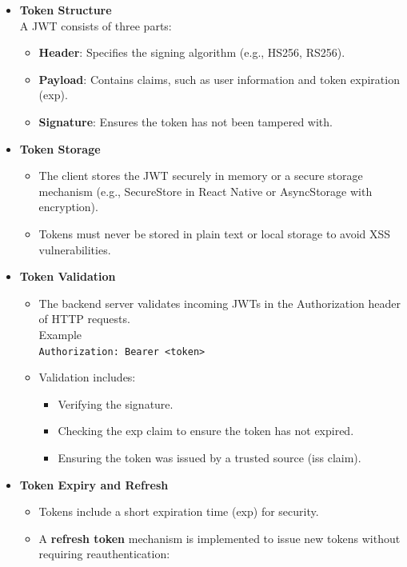 \documentclass[12pt, titlepage]{article}
\begin{document}
\begin{enumerate}
\begin{itemize}
\begin{itemize}
\begin{itemize}
			\end{itemize}
			\item \textbf{Token Structure}
			\\ A JWT consists of three parts:
			\begin{itemize}
				\item \textbf{Header}: Specifies the signing algorithm (e.g., HS256, RS256).
				\item \textbf{Payload}: Contains claims, such as user information and token expiration (exp).
				\item \textbf{Signature}: Ensures the token has not been tampered with.
			\end{itemize}
			\item \textbf{Token Storage}
			\begin{itemize}
				\item The client stores the JWT securely in memory or a secure storage mechanism (e.g., SecureStore in React Native or AsyncStorage with encryption).
				\item Tokens must never be stored in plain text or local storage to avoid XSS vulnerabilities.
			\end{itemize}
			\item \textbf{Token Validation}
			\begin{itemize}
				\item The backend server validates incoming JWTs in the Authorization header of HTTP requests.
				\\ Example \\
				\texttt{Authorization: Bearer <token>}
				\item Validation includes:
				\begin{itemize}
					\item Verifying the signature.
					\item Checking the exp claim to ensure the token has not expired.
					\item Ensuring the token was issued by a trusted source (iss claim).
				\end{itemize}
			\end{itemize}
			\item \textbf{Token Expiry and Refresh}
			\begin{itemize}
				\item Tokens include a short expiration time (exp) for security.
				\item A \textbf{refresh token} mechanism is implemented to issue new tokens without requiring reauthentication:
				\begin{itemize}

\end{itemize}
\end{itemize}
\end{itemize}
\end{itemize}
\end{enumerate}
\end{document}
